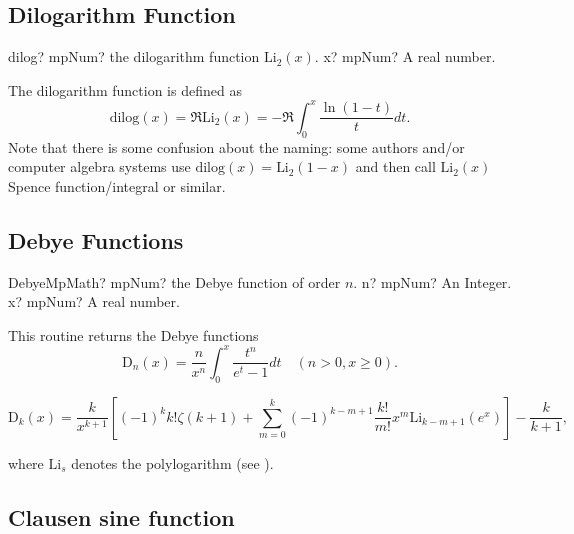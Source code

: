 \subsection{Dilogarithm Function}
\label{DiGammaFunction}

\begin{mpFunctionsExtract}
	\mpFunctionOne
	{dilog? mpNum? the dilogarithm function $\text{Li}_2(x)$.}
	{x? mpNum? A real number.}
\end{mpFunctionsExtract}


\vspace{0.3cm}
The dilogarithm function is defined as
\begin{equation}
	\text{dilog}(x) = \Re \text{Li}_2(x) = -\Re \int_0^x \frac{\ln(1-t)}{t}dt.
\end{equation}
Note that there is some confusion about the naming: some authors and/or computer algebra systems use $\text{dilog}(x) = \text{Li}_2(1-x)$ and then call $\text{Li}_2(x)$ Spence function/integral or similar.




\subsection{Debye Functions}

\begin{mpFunctionsExtract}
	\mpFunctionTwoNotImplemented
	{DebyeMpMath? mpNum? the Debye function of order $n$.}
	{n? mpNum? An Integer.}
	{x? mpNum? A real number.}
\end{mpFunctionsExtract}


\vspace{0.3cm}
This routine returns the Debye functions
\begin{equation}
\text{D}_n(x) = \frac{n}{x^n} \int_0^x \frac{t^n}{e^t-1} dt \quad (n>0, x \geq 0).
\end{equation}

\begin{equation}
\text{D}_k(x) = \frac{k}{x^{k+1}} \left[(-1)^k k! \zeta(k+1) + \sum_{m=0}^k (-1)^{k-m+1} \frac{k!}{m!} x^m \text{Li}_{k-m+1}(e^x) \right] - \frac{k}{k+1},
\end{equation}

where $\text{Li}_s$ denotes the polylogarithm (see \cite{Dubinov_2008}).



\subsection{Clausen sine function}

